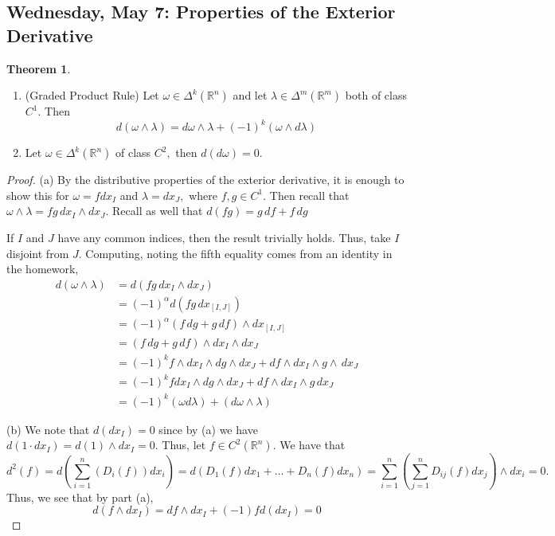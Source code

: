 \documentclass[10pt, oneside]{article}
\newcommand{\bbR}{\mathbb{R}}
\theoremstyle{definition}
\newtheorem{thm}{Theorem}
\begin{document}
\subsection{Wednesday, May 7: Properties of the Exterior Derivative}
\begin{thm}
\begin{enumerate}
    \item (Graded Product Rule) Let $\omega \in \Delta^k(\bbR^n)$ and let $\lambda \in \Delta^m(\bbR^m)$ both of class $C^1.$ Then 
    \[d(\omega \wedge \lambda)=d\omega \wedge \lambda + (-1)^k (\omega \wedge d\lambda)\]
    \item Let $\omega \in \Delta^k(\bbR^n)$ of class $C^2,$ then $d(d\omega) = 0.$
\end{enumerate}
\end{thm}
\begin{proof}
    (a) By the distributive properties of the exterior derivative, it is enough to show this for $\omega = f dx_I$ and $\lambda = dx_J,$ where $f,g \in C^1.$ Then recall that $\omega \wedge \lambda = fg\, dx_I \wedge dx_J.$ Recall as well that $d(fg) = g\,df + f\, dg$ 
    
    If $I$ and $J$ have any common indices, then the result trivially holds. Thus, take $I$ disjoint from $J.$ Computing, noting the fifth equality comes from an identity in the homework,
    \begin{align*}
        d(\omega \wedge \lambda) &= d\left(fg \, dx_I \wedge dx_J\right)\\
        &= (-1)^\alpha d(fg \, dx_{[I,J]})\\
        &= (-1)^\alpha \left(f\,dg + g\,df\right)\wedge dx_{[I,J]}\\
        &= (f\,dg + g\, df)\wedge dx_I\wedge dx_J\\
        &= (-1)^kf \wedge dx_I \wedge dg \wedge dx_J + df\wedge dx_I \wedge g\wedge \,dx_J\\
        &= (-1)^kf  dx_I \wedge dg \wedge dx_J + df\wedge dx_I \wedge g \,dx_J\\
        &= (-1)^k (\omega d\lambda) + (d\omega \wedge \lambda)
    \end{align*}

    (b) We note that $d(d x_I) = 0$ since  by (a) we have $d(1\cdot dx_I) = d(1)\wedge dx_I = 0.$ Thus, let $f\in C^2(\bbR^n).$ We have that \[d^2(f) = d\left( \sum_{i=1}^n (D_i(f))dx_i\right) = d\left(D_1(f)dx_1 + \dots + D_n(f)dx_n\right)= \sum_{i=1}^n \left(\sum_{j=1}^n D_{ij}(f)dx_j\right) \wedge dx_i = 0.\] Thus, we see that by part (a), 
    \[d(f \wedge dx_I) = df \wedge dx_I + (-1) fd(dx_I) = 0\]
\end{proof}
\end{document}
